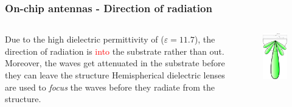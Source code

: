\documentclass[10pt]{beamer}
\newcommand{\E}{\varepsilon}  %
\begin{document}
\begin{frame}
    \frametitle{On-chip antennas - Direction of radiation}
    \begin{columns}[T]
        \begin{column}{.5\textwidth}
            \begin{outline}
                \1 Due to the high dielectric permittivity of  ($\E = 11.7$), the direction of radiation is \textcolor{red}{into} the substrate rather than out.
                \1 Moreover, the waves get attenuated in the substrate before they can leave the structure
                \1 Hemispherical dielectric lenses are used to \textit{focus} the waves before they radiate from the structure.
            \end{outline}
        \end{column}
        \begin{column}{.5\textwidth}
            \begin{figure}[T!]
                \centering
                \includegraphics[width=.55\textwidth]{lens_onchipantennas.pdf}
                \label{fig:lens_on_chip}
            \end{figure}
        \end{column}
    \end{columns}
\end{frame}
\end{document}
